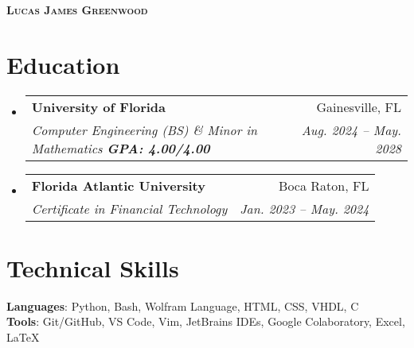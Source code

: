 \documentclass[letterpaper,11pt]{article} %
\makeatletter
\newcommand{\resumeSubheading}[4]{
  \vspace{-3pt}\item
    \begin{tabular*}{0.97\textwidth}[t]{l@{\extracolsep{\fill}}r}
      \textbf{#1} & #2 \\
      \textit{\small#3} & \textit{\small #4} \\
    \end{tabular*}\vspace{-7pt}
}
\newcommand{\resumeSubHeadingListStart}{\begin{itemize}[leftmargin=0.15in, label={}]}
\newcommand{\resumeSubHeadingListEnd}{\end{itemize}}
\makeatother
\begin{document}

\begin{center}
    \textbf{\scshape Lucas James Greenwood} 
\end{center}


\section{Education}
  \resumeSubHeadingListStart
    \resumeSubheading
      {University of Florida}{Gainesville, FL}
      {Computer Engineering (BS) \& Minor in Mathematics \textbf{\emph{GPA: 4.00/4.00}}}{Aug. 2024 -- May. 2028}
    \resumeSubheading{Florida Atlantic University}{Boca Raton, FL}{Certificate in Financial Technology}{Jan. 2023 -- May. 2024}
  \resumeSubHeadingListEnd

\section{Technical Skills}
 \begin{itemize}[leftmargin=0.15in, label={}]
    \small{\item{
     \textbf{Languages}{: Python, Bash, Wolfram Language, HTML, CSS, VHDL, C} \\
     \textbf{Tools}{: Git/GitHub, VS Code, Vim, JetBrains IDEs, Google Colaboratory, Excel, LaTeX} \\
    }}
 \end{itemize}


\end{document}
